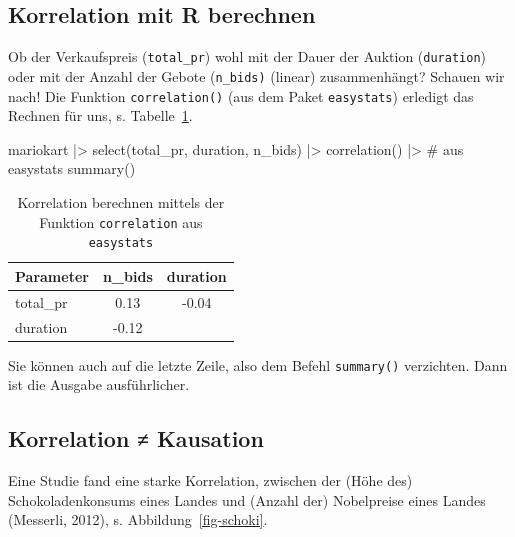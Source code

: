 \documentclass[
  a4paper,
]{scrbook}
\newenvironment{Shaded}{\begin{snugshade}}{\end{snugshade}}
\newcommand{\CommentTok}[1]{\textcolor[rgb]{0.37,0.37,0.37}{#1}}
\newcommand{\FunctionTok}[1]{\textcolor[rgb]{0.28,0.35,0.67}{#1}}
\newcommand{\NormalTok}[1]{\textcolor[rgb]{0.00,0.23,0.31}{#1}}
\newcommand{\SpecialCharTok}[1]{\textcolor[rgb]{0.37,0.37,0.37}{#1}}
\theoremstyle{definition}
\theoremstyle{definition}
\theoremstyle{definition}
\theoremstyle{remark}
\begin{document}
\subsection{Korrelation mit R
berechnen}\label{korrelation-mit-r-berechnen}

Ob der Verkaufspreis (\texttt{total\_pr}) wohl mit der Dauer der Auktion
(\texttt{duration}) oder mit der Anzahl der Gebote (\texttt{n\_bids)}
(linear) zusammenhängt? Schauen wir nach! Die Funktion
\texttt{correlation()} (aus dem Paket \texttt{easystats}) erledigt das
Rechnen für uns, s. Tabelle~\ref{tbl-mario-corr1}.

\begin{Shaded}
\begin{Highlighting}[]
\NormalTok{mariokart }\SpecialCharTok{|\textgreater{}} 
  \FunctionTok{select}\NormalTok{(total\_pr, duration, n\_bids) }\SpecialCharTok{|\textgreater{}} 
  \FunctionTok{correlation}\NormalTok{()  }\SpecialCharTok{|\textgreater{}}  \CommentTok{\# aus \textasciigrave{}easystats\textasciigrave{}}
  \FunctionTok{summary}\NormalTok{()}
\end{Highlighting}
\end{Shaded}

\begin{longtable}[]{@{}lcc@{}}

\caption{\label{tbl-mario-corr1}Korrelation berechnen mittels der
Funktion \texttt{correlation} aus \texttt{easystats}}

\tabularnewline

\toprule\noalign{}
Parameter & n\_bids & duration \\
\midrule\noalign{}
\endhead
\bottomrule\noalign{}
\endlastfoot
total\_pr & 0.13 & -0.04 \\
duration & -0.12 & \\

\end{longtable}

Sie können auch auf die letzte Zeile, also dem Befehl \texttt{summary()}
verzichten. Dann ist die Ausgabe ausführlicher.

\subsection{Korrelation ≠ Kausation}\label{korrelation-kausation}

Eine Studie fand eine starke Korrelation, zwischen der (Höhe des)
Schokoladenkonsums eines Landes und (Anzahl der) Nobelpreise eines
Landes (Messerli, 2012), s. Abbildung~\ref{fig-schoki}.
\end{document}
